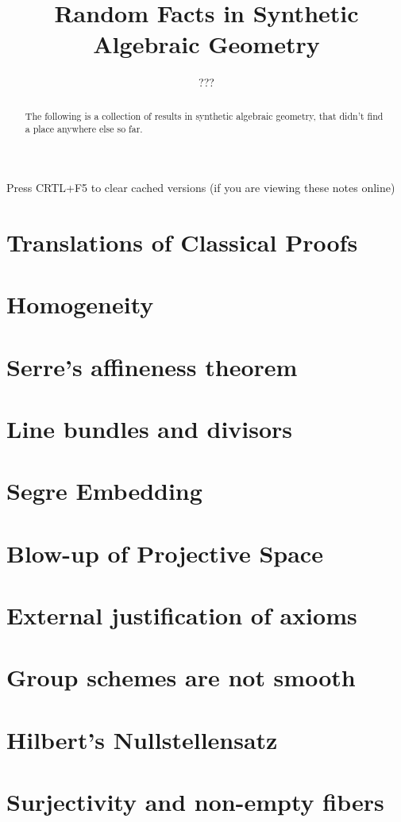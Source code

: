 \documentclass{../util/zariski}
\title{Random Facts in Synthetic Algebraic Geometry}
\author{???}
\begin{document}
\maketitle

\begin{center}
  \color{purple}
  \large{Press CRTL+F5 to clear cached versions}
  \large{(if you are viewing these notes online)}
\end{center}

\begin{abstract}
  The following is a collection of results in synthetic algebraic geometry,
  that didn't find a place anywhere else so far.
\end{abstract}

\tableofcontents

\section{Translations of Classical Proofs}


\section{Homogeneity}


\section{Serre's affineness theorem}


\section{Line bundles and divisors}


\section{Segre Embedding}


\section{Blow-up of Projective Space}


\section{External justification of axioms}


\section{Group schemes are not smooth}


\section{Hilbert's Nullstellensatz}


\section{Surjectivity and non-empty fibers}


\printindex

\printbibliography
\end{document}
